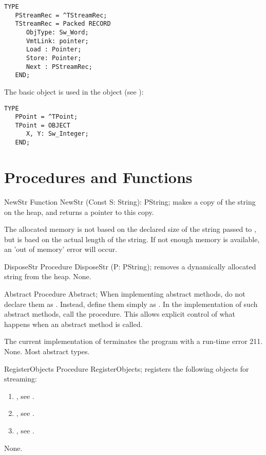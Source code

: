 \begin{verbatim}
TYPE
   PStreamRec = ^TStreamRec;
   TStreamRec = Packed RECORD
      ObjType: Sw_Word;
      VmtLink: pointer;
      Load : Pointer;
      Store: Pointer;
      Next : PStreamRec;
   END;
\end{verbatim}

The  basic object is used in the  object (see
):
\begin{verbatim}
TYPE
   PPoint = ^TPoint;
   TPoint = OBJECT
      X, Y: Sw_Integer;
   END;
\end{verbatim}

\section{Procedures and Functions}

\begin{function}{NewStr}
\Declaration
Function NewStr (Const S: String): PString;
\Description
{} makes a copy of the string  on the heap,
and returns a pointer to this copy.

The allocated memory is not based on the declared size of the string passed
to , but is baed on the actual length of the string.
\Errors
If not enough memory is available, an 'out of memory' error will occur.
\SeeAlso
{}
\end{function}

\begin{procedure}{DisposeStr}
\Declaration
Procedure DisposeStr (P: PString);
\Description
{} removes a dynamically allocated string from the heap.
\Errors
None.
\SeeAlso
{}
\end{procedure}


\begin{procedure}{Abstract}
\Declaration
Procedure Abstract;
\Description
When implementing abstract methods, do not declare them as .
Instead, define them simply as . In the implementation of such
abstract methods, call the  procedure. This allows explicit
control of what happens when an abstract method is called.

The current implementation of  terminates the program with 
a run-time error 211.
\Errors
None.
\SeeAlso Most abstract types.
\end{procedure}

\begin{procedure}{RegisterObjects}
\Declaration
Procedure RegisterObjects;
\Description
{} registers the following objects for streaming:
\begin{enumerate}
\item {}, see .
\item {}, see .
\item {}, see .
\end{enumerate}
\Errors
None.
\SeeAlso
{}
\end{procedure}

